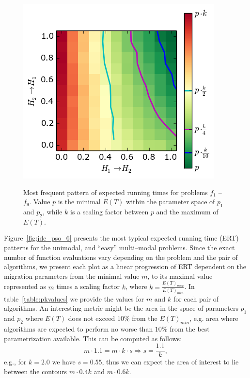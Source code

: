 \documentclass{sig-alternate}
\begin{document}
\begin{figure}[ht!]
{    \label{tax:tax4}
    \includegraphics[width=0.45\columnwidth]{figures/taxonomy_cmaes_jde_cec_6.png}
}
\caption{Most frequent pattern of expected running times for problems $f_1$ -- $f_9$. Value $p$ is the minimal $E(T)$ within the parameter space of $p_1$ and $p_2$, while $k$ is a scaling factor between $p$ and the maximum of $E(T)$.} %
\end{figure}
Figure~\ref{fig:jde_pso_6} presents the most typical expected running time (ERT) patterns for the unimodal, and ``easy'' multi--modal problems.
Since the exact number of function evaluations vary depending on the problem and the pair of algorithms, we present each plot as a linear progression of ERT dependent on the migration parameters from the minimal value $m$, to its maximal value represented as $m$ times a scaling factor $k$, where $k = \frac{E(T)_{max}}{E(T)_{min}}$.
In table~\ref{table:pkvalues} we provide the values for $m$ and $k$ for each pair of algorithms.
An interesting metric might be the area in the space of parameters $p_1$ and $p_2$ where $E(T)$ does not exceed $10\%$ from the $E(T)_{min}$, e.g. area where algorithms are expected to perform no worse than $10\%$ from the best parametrization available.
This can be computed as follows:
$$
m \cdot 1.1 = m \cdot k \cdot s \Rightarrow s = \frac{1.1}{k},
$$
e.g., for $k=2.0$ we have $s=0.55$, thus we can expect the area of interest to lie between the contours $m \cdot0.4 k$ and $m \cdot 0.6 k$.
\end{document}
